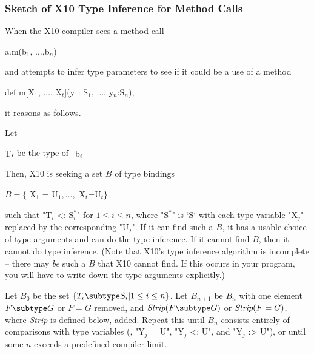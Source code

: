 \subsubsection{Sketch of X10 Type Inference for Method Calls}

When the X10 compiler sees a method call 
\begin{xtenmath}
a.m(b$_1$, $\ldots$,b$_n$)
\end{xtenmath}
and attempts to infer type parameters to
see if it could be a use of a
method 
\begin{xtenmath}
def m[X$_1$, $\ldots$, X$_t$](y$_1$: S$_1$, $\ldots$, y$_n$:S$_n$),
\end{xtenmath}
it reasons as follows. 



Let 
\begin{xtenmath}
T$_i \mbox{\rm ~be the type of }$ b$_i$
\end{xtenmath}
Then, X10 is seeking a
set {$B$}  of type 
bindings 
\begin{xtenmath}
$B = \{$ X$_1$ = U$_1, \ldots, $ X$_t$=U$_t\}$
\end{xtenmath}
such that 
\xcdmath"T$_i$ <: S$^*_i$" for {$1 \le i \le n$}, where \xcdmath"S$^*$" is
\xcd`S` with each type variable \xcdmath"X$_j$" replaced by the corresponding
\xcdmath"U$_j$".  If it can find such a {$B$}, it has a usable choice of type
arguments and can do the type inference.  If it cannot find {$B$}, then it
cannot do type inference.    (Note that X10's type inference algorithm is
incomplete -- there may {\em be} such a {$B$} that X10 cannot find.  If this
occurs in your program, you will have to write down the type arguments
explicitly.) 

Let $B_0$ be the set {$\{ T_i \subtype S_i | 1 \le i \le n\}$}.  Let
{$B_{n+1}$} be {$B_n$} with one element {$F \subtype G$} or 
{$F = G$} removed, and
{$\mbox{\it Strip}(F \subtype G)$} 
or {$\mbox{\it Strip}(F = G)$}, where     {\em Strip} is defined below, added.  Repeat this until 
{$B_n$} consists entirely of comparisons with type variables (\viz, 
\xcdmath"Y$_j$ = U", 
\xcdmath"Y$_j$ <: U", and
\xcdmath"Y$_j$ :> U"), 
or until some {$n$} exceeds a predefined compiler limit. 

